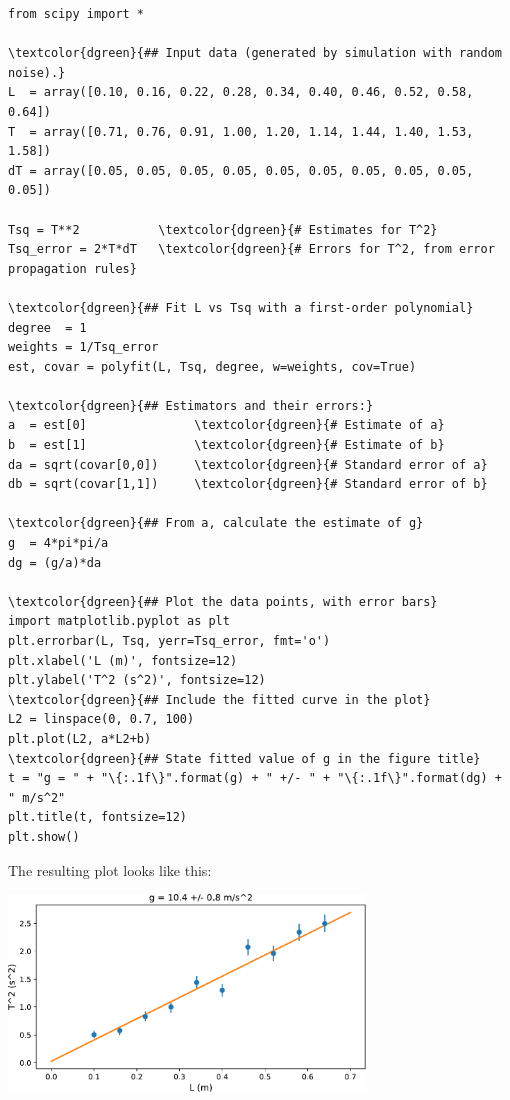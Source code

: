 \documentclass[11pt,a4paper]{article}
\begin{document}
\begin{Verbatim}[frame=single,baselinestretch=1,fontsize=\small,commandchars=\\\{\}]
from scipy import *

\textcolor{dgreen}{## Input data (generated by simulation with random noise).}
L  = array([0.10, 0.16, 0.22, 0.28, 0.34, 0.40, 0.46, 0.52, 0.58, 0.64])
T  = array([0.71, 0.76, 0.91, 1.00, 1.20, 1.14, 1.44, 1.40, 1.53, 1.58])
dT = array([0.05, 0.05, 0.05, 0.05, 0.05, 0.05, 0.05, 0.05, 0.05, 0.05])

Tsq = T**2           \textcolor{dgreen}{# Estimates for T^2}
Tsq_error = 2*T*dT   \textcolor{dgreen}{# Errors for T^2, from error propagation rules}

\textcolor{dgreen}{## Fit L vs Tsq with a first-order polynomial}
degree  = 1
weights = 1/Tsq_error
est, covar = polyfit(L, Tsq, degree, w=weights, cov=True)

\textcolor{dgreen}{## Estimators and their errors:}
a  = est[0]               \textcolor{dgreen}{# Estimate of a}
b  = est[1]               \textcolor{dgreen}{# Estimate of b}
da = sqrt(covar[0,0])     \textcolor{dgreen}{# Standard error of a}
db = sqrt(covar[1,1])     \textcolor{dgreen}{# Standard error of b}

\textcolor{dgreen}{## From a, calculate the estimate of g}
g  = 4*pi*pi/a
dg = (g/a)*da

\textcolor{dgreen}{## Plot the data points, with error bars}
import matplotlib.pyplot as plt
plt.errorbar(L, Tsq, yerr=Tsq_error, fmt='o')
plt.xlabel('L (m)', fontsize=12)
plt.ylabel('T^2 (s^2)', fontsize=12)
\textcolor{dgreen}{## Include the fitted curve in the plot}
L2 = linspace(0, 0.7, 100)
plt.plot(L2, a*L2+b)
\textcolor{dgreen}{## State fitted value of g in the figure title}
t = "g = " + "\{:.1f\}".format(g) + " +/- " + "\{:.1f\}".format(dg) + " m/s^2"
plt.title(t, fontsize=12)
plt.show()
\end{Verbatim}
The resulting plot looks like this:
\begin{center}
  \includegraphics[width=0.71\textwidth]{errorpy.pdf}
\end{center}
\end{document}
